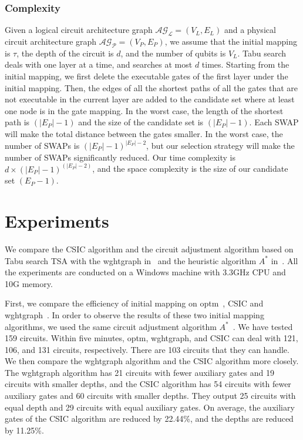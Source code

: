 \documentclass[runningheads]{llncs}
\begin{document}
\subsubsection{Complexity}
Given a logical circuit architecture graph  $\mathcal{AG_{L}}=(V_{L},E_{L})$ and a physical circuit architecture graph $\mathcal{AG_{P}}=(V_{P},E_{P})$, we assume that the initial mapping is $\tau$, the depth of the circuit is $d$, and the number of qubits is $V_{L}$. Tabu search deals with one layer at a time, and searches at most $d$ times. Starting from the initial mapping, we first delete the executable gates of the first layer under the initial mapping. Then, the edges of all the shortest paths of all the gates that are not executable in the current layer are added to the candidate set where at least one node is in the gate mapping. In the worst case, the length of the shortest path  is $(|E_{P}|-1)$
and the size of the candidate set  is $(|E_{P}|-1)$. Each SWAP will make the total distance between the gates smaller. In the worst case, the number of SWAPs is $(|E_{P}|-1)^{|E_{P}|-2}$, but our selection strategy will make the number of SWAPs significantly reduced. Our time complexity is $d\times (|E_{P}|-1)^{(|E_{P}|-2)}$, and the space complexity is the size of our candidate set $(E_{P}-1)$.
\section{Experiments}
\label{Experiment}
We compare the  CSIC  algorithm 
and the circuit adjustment algorithm based on Tabu search TSA with the wghtgraph in~\cite{2020Qubit} and the heuristic algorithm $ A^{*}$  in~\cite{Zulehner2017}.
All the experiments are conducted on a Windows machine with 3.3GHz CPU and 10G memory. 
 
First, we compare the efficiency of initial mapping on optm~\cite{Zulehner2017},  CSIC and wghtgraph~\cite{2020Qubit}. In order to  observe the results of these two initial mapping algorithms, we used the same circuit adjustment algorithm $A^{*}$~\cite{Zulehner2017}.
We have tested 159 circuits. Within five minutes, optm,  wghtgraph, and CSIC  can deal with 121, 106, and  131 circuits, respectively. There are 103 circuits that they can handle. We then compare the wghtgraph algorithm and the CSIC algorithm more closely. The wghtgraph algorithm has 21 circuits with fewer auxiliary gates  and 19 circuits with smaller depths, and the CSIC algorithm has 54 circuits with fewer auxiliary gates and 60 circuits with  smaller depths. They output 25 circuits with equal depth and  29 circuits with equal auxiliary gates. On average, the auxiliary gates of the CSIC algorithm are reduced by 22.44\%, 
and the depths are reduced by 11.25\%.
\end{document}
